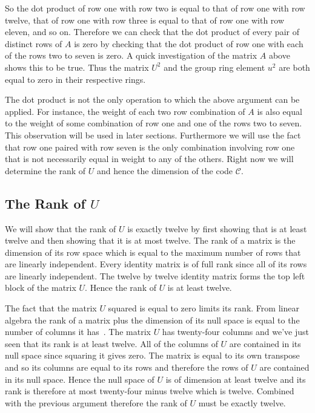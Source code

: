 So the dot product of row one with row two is equal to that of row one with row twelve, that of row one with row three is equal to that of row one with row eleven, and so on.
Therefore we can check that the dot product of every pair of distinct rows of $A$ is zero by checking that the dot product of row one with each of the rows two to seven is zero.
A quick investigation of the matrix $A$ above shows this to be true.
Thus the matrix $U^2$ and the group ring element $u^2$ are both equal to zero in their respective rings.

The dot product is not the only operation to which the above argument can be applied.
For instance, the weight of each two row combination of $A$ is also equal to the weight of some combination of row one and one of the rows two to seven.
This observation will be used in later sections.
Furthermore we will use the fact that row one paired with row seven is the only combination involving row one that is not necessarily equal in weight to any of the others.
Right now we will determine the rank of $U$ and hence the dimension of the code $\mathcal{C}$.

\subsection{The Rank of $U$}
\label{sect:golayrankofu}
We will show that the rank of $U$ is exactly twelve by first showing that is at least twelve and then showing that it is at most twelve.
The rank of a matrix is the dimension of its row space which is equal to the maximum number of rows that are linearly independent.
Every identity matrix is of full rank since all of its rows are linearly independent.
The twelve by twelve identity matrix forms the top left block of the matrix $U$.
Hence the rank of $U$ is at least twelve.

The fact that the matrix $U$ squared is equal to zero limits its rank.
From linear algebra the rank of a matrix plus the dimension of its null space is equal to the number of columns it has~\cite[p.~245]{mac99}.
The matrix $U$ has twenty-four columns and we've just seen that its rank is at least twelve.
All of the columns of $U$ are contained in its null space since squaring it gives zero.
The matrix is equal to its own transpose and so its columns are equal to its rows and therefore the rows of $U$ are contained in its null space.
Hence the null space of $U$ is of dimension at least twelve and its rank is therefore at most twenty-four minus twelve which is twelve.
Combined with the previous argument therefore the rank of $U$ must be exactly twelve.

